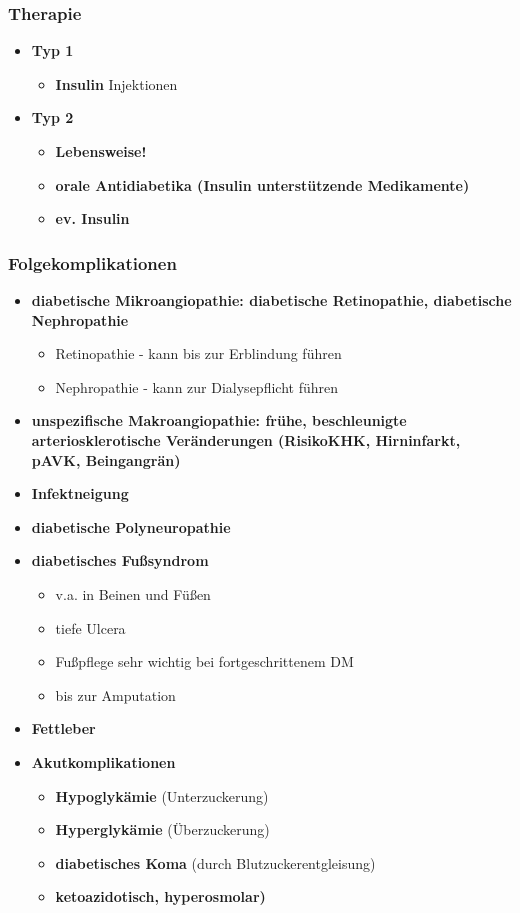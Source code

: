 	\subsubsection{Therapie}
			\begin{itemize}
				\item \textbf{Typ 1}
					\begin{itemize}
						\item \textbf{Insulin} Injektionen
					\end{itemize}
				\item \textbf{Typ 2}
					\begin{itemize}
						\item \textbf{Lebensweise!}
						\item \textbf{orale Antidiabetika (Insulin unterstützende Medikamente)}
						\item \textbf{ev. Insulin}
					\end{itemize}
			\end{itemize}
	\subsubsection{Folgekomplikationen}
			\begin{itemize}
				\item \textbf{diabetische Mikroangiopathie: diabetische Retinopathie, diabetische Nephropathie}
					\begin{itemize}
						\item Retinopathie - kann bis zur Erblindung führen
						\item Nephropathie - kann zur Dialysepflicht führen
					\end{itemize}
				\item \textbf{unspezifische Makroangiopathie: frühe, beschleunigte arteriosklerotische Veränderungen (RisikoKHK, Hirninfarkt, pAVK, Beingangrän)}
				\item \textbf{Infektneigung}
				\item \textbf{diabetische Polyneuropathie}
				\item \textbf{diabetisches Fußsyndrom}
					\begin{itemize}
						\item v.a. in Beinen und Füßen
						\item tiefe Ulcera
						\item Fußpflege sehr wichtig bei fortgeschrittenem DM
						\item bis zur Amputation
					\end{itemize}
				\item \textbf{Fettleber}
				\item \textbf{Akutkomplikationen}
					\begin{itemize}
						\item \textbf{Hypoglykämie} (Unterzuckerung)
						\item \textbf{Hyperglykämie} (Überzuckerung)
						\item \textbf{diabetisches Koma} (durch Blutzuckerentgleisung)
						\item \textbf{ketoazidotisch, hyperosmolar)}
					\end{itemize}
			\end{itemize}
